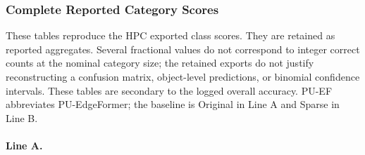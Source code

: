 \subsubsection{Complete Reported Category Scores}\label{sec:class-results}
These tables reproduce the HPC exported class scores. They are retained as reported aggregates. Several fractional values do not correspond to integer correct counts at the nominal category size; the retained exports do not justify reconstructing a confusion matrix, object-level predictions, or binomial confidence intervals. These tables are secondary to the logged overall accuracy. PU-EF abbreviates PU-EdgeFormer; the baseline is Original in Line A and Sparse in Line B.
\paragraph{Line A.}
